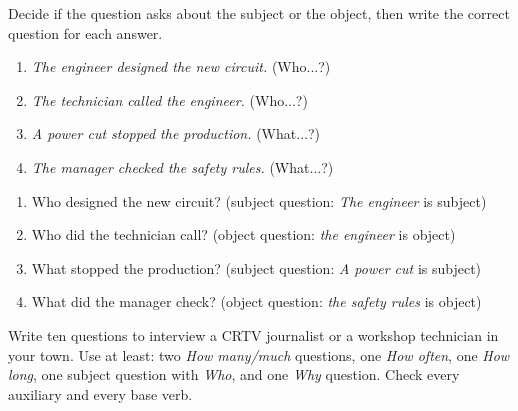 \documentclass[11pt]{article}
\begin{document}
\begin{exercice}
Decide if the question asks about the subject or the object, then write the correct question for each answer.
\begin{enumerate}
\item \emph{The engineer designed the new circuit.} (Who...?)
\item \emph{The technician called the engineer.} (Who...?)
\item \emph{A power cut stopped the production.} (What...?)
\item \emph{The manager checked the safety rules.} (What...?)
\end{enumerate}
\end{exercice}

\begin{corrige}
\begin{enumerate}
\item Who designed the new circuit? (subject question: \emph{The engineer} is subject)
\item Who did the technician call? (object question: \emph{the engineer} is object)
\item What stopped the production? (subject question: \emph{A power cut} is subject)
\item What did the manager check? (object question: \emph{the safety rules} is object)
\end{enumerate}
\end{corrige}

\begin{exercice}
Write ten questions to interview a CRTV journalist or a workshop technician in your town. Use at least: two \emph{How many/much} questions, one \emph{How often}, one \emph{How long}, one subject question with \emph{Who}, and one \emph{Why} question. Check every auxiliary and every base verb.
\end{exercice}
\end{document}
